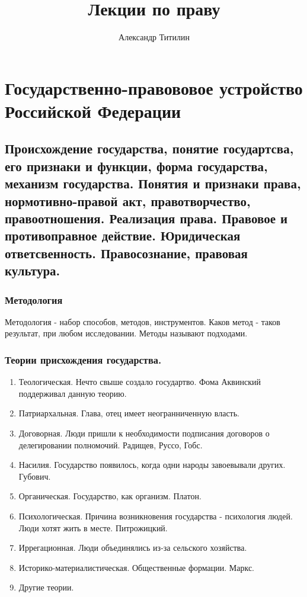 \documentclass{article}
\title{Лекции по праву}
\author{Александр Титилин}
\date{}
\begin{document}
\maketitle
\tableofcontents
\section{Государственно-правововое устройство Российской Федерации}
\subsection{Происхождение государства, понятие государтсва, его признаки и функции,
	форма государства, механизм государства. Понятия и признаки права, нормотивно-правой
	акт, правотворчество, правоотношения. Реализация права. Правовое и противоправное действие.
	Юридическая ответсвенность. Правосознание, правовая культура.}
\subsubsection{Методология}
Методология - набор способов, методов, инструментов. Каков метод - таков результат, при любом исследовании.
Методы называют подходами.
\subsubsection{Теории присхождения государства.}
\begin{enumerate}
	\item Теологическая. Нечто свыше создало государтво. Фома Аквинский поддерживал данную теорию.
	\item Патриархальная. Глава, отец имеет неогранниченную власть.
	\item Договорная. Люди пришли к необходимости подписания договоров о делегировании полномочий. Радищев, Руссо, Гобс.
	\item Насилия. Государство появилось, когда одни народы завоевывали других. Губович.
	\item Органическая. Государство, как организм. Платон.
	\item Психологическая. Причина возникновения государства - психология людей. Люди
	      хотят жить в месте. Питрожицкий.
	\item Иррегационная. Люди объединялись из-за сельского хозяйства.
    \item Историко-материалистическая. Общественные формации. Маркс.
    \item Другие теории.
\end{enumerate}
\end{document}

